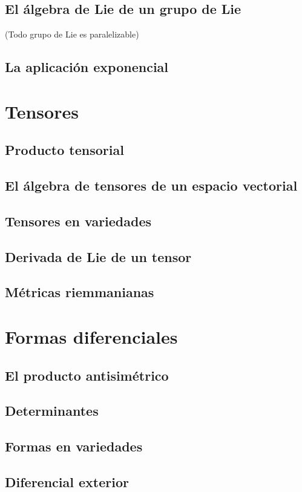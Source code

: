 \documentclass[12pt,a4paper]{book}
\theoremstyle{definition} \newtheorem{defn}[thm]{Definición}
\theoremstyle{definition} \newtheorem{ejemplo}[thm]{Ejemplo}
\theoremstyle{definition} \newtheorem{ejercicio}[thm]{Ejercicio}
\theoremstyle{remark} \newtheorem*{obs}{Observación}
\begin{document}
	  \section{El álgebra de Lie de un grupo de Lie}
	  (Todo grupo de Lie es paralelizable)
	  \section{La aplicación exponencial}
	  \chapter{Tensores}
	  \section{Producto tensorial}
	  \section{El álgebra de tensores de un espacio vectorial}
	  \section{Tensores en variedades}
	  \section{Derivada de Lie de un tensor}
	  \section{Métricas riemmanianas}

	  \chapter{Formas diferenciales}
	  \section{El producto antisimétrico}
	  \section{Determinantes}
	  \section{Formas en variedades}
	  \section{Diferencial exterior}
\end{document}
